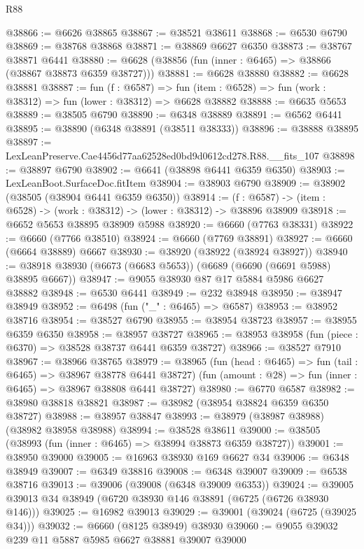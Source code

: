 \begin{lexlean}{R88}
\begin{coremodule}
@38866 := @6626 @38865
@38867 := @38521 @38611
@38868 := @6530 @6790
@38869 := @38768 @38868
@38871 := @38869 @6627 @6350
@38873 := @38767 @38871 @6441
@38880 := @6628 (@38856 (fun (inner : @6465) => @38866 (@38867 @38873 @6359 @38727)))
@38881 := @6628 @38880
@38882 := @6628 @38881
@38887 := fun (f : @6587) =>
  fun (item : @6528) => fun (work : @38312) => fun (lower : @38312) => @6628 @38882
@38888 := @6635 @5653
@38889 := @38505 @6790
@38890 := @6348 @38889
@38891 := @6562 @6441
@38895 := @38890 (@6348 @38891 (@38511 @38333))
@38896 := @38888 @38895
@38897 := LexLeanPreserve.Cae4456d77aa62528ed0bd9d0612cd278.R88.__fits_107
@38898 := @38897 @6790
@38902 := @6641 (@38898 @6441 @6359 @6350)
@38903 := LexLeanBoot.SurfaceDoc.fitItem
@38904 := @38903 @6790
@38909 := @38902 (@38505 (@38904 @6441 @6359 @6350))
@38914 := (f : @6587) -> (item : @6528) -> (work : @38312) -> (lower : @38312) -> @38896 @38909
@38918 := @6652 @5653 @38895 @38909 @5988
@38920 := @6660 (@7763 @38331)
@38922 := @6660 (@7766 @38510)
@38924 := @6660 (@7769 @38891)
@38927 := @6660 (@6664 @38889) @6667
@38930 := @38920 (@38922 (@38924 @38927))
@38940 := @38918 @38930 (@6673 (@6683 @5653)) (@6689 (@6690 (@6691 @5988) @38895 @6667))
@38947 := @9055 @38930 @87 @17 @5884 @5986 @6627 @38882
@38948 := @6530 @6441
@38949 := @232 @38948
@38950 := @38947 @38949
@38952 := @6498 (fun ("_" : @6465) => @6587)
@38953 := @38952 @38716
@38954 := @38527 @6790
@38955 := @38954 @38723
@38957 := @38955 @6359 @6350
@38958 := @38957 @38727
@38965 := @38953 @38958 (fun (piece : @6370) => @38528 @38737 @6441 @6359 @38727)
@38966 := @38527 @7910
@38967 := @38966 @38765
@38979 := @38965
    (fun (head : @6465) => fun (tail : @6465) => @38967 @38778 @6441 @38727)
    (fun (amount : @28) => fun (inner : @6465) => @38967 @38808 @6441 @38727)
@38980 := @6770 @6587
@38982 := @38980 @38818 @38821
@38987 := @38982 (@38954 @38824 @6359 @6350 @38727)
@38988 := @38957 @38847
@38993 := @38979 (@38987 @38988) (@38982 @38958 @38988)
@38994 := @38528 @38611
@39000 := @38505 (@38993 (fun (inner : @6465) => @38994 @38873 @6359 @38727))
@39001 := @38950 @39000
@39005 := @16963 @38930 @169 @6627 @34
@39006 := @6348 @38949
@39007 := @6349 @38816
@39008 := @6348 @39007
@39009 := @6538 @38716
@39013 := @39006 (@39008 (@6348 @39009 @6353))
@39024 := @39005 @39013 @34 @38949 (@6720 @38930 @146 @38891 (@6725 (@6726 @38930 @146)))
@39025 := @16982 @39013
@39029 := @39001 (@39024 (@6725 (@39025 @34)))
@39032 := @6660 (@8125 @38949) @38930
@39060 := @9055
    @39032
    @239
    @11
    @5887
    @5985
    @6627
    @38881
    @39007
    @39000

\end{coremodule}
\end{lexlean}
